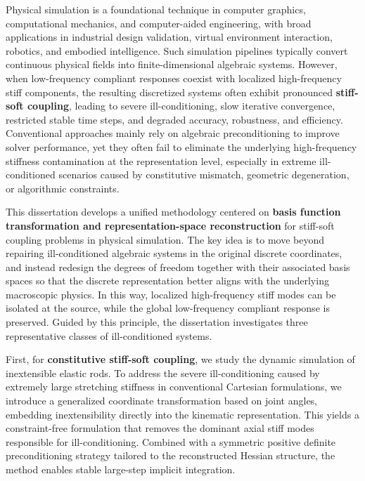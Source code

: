Physical simulation is a foundational technique in computer graphics, computational mechanics, and computer-aided engineering, with broad applications in industrial design validation, virtual environment interaction, robotics, and embodied intelligence. Such simulation pipelines typically convert continuous physical fields into finite-dimensional algebraic systems. However, when low-frequency compliant responses coexist with localized high-frequency stiff components, the resulting discretized systems often exhibit pronounced \textbf{stiff-soft coupling}, leading to severe ill-conditioning, slow iterative convergence, restricted stable time steps, and degraded accuracy, robustness, and efficiency. Conventional approaches mainly rely on algebraic preconditioning to improve solver performance, yet they often fail to eliminate the underlying high-frequency stiffness contamination at the representation level, especially in extreme ill-conditioned scenarios caused by constitutive mismatch, geometric degeneration, or algorithmic constraints.

This dissertation develops a unified methodology centered on \textbf{basis function transformation and representation-space reconstruction} for stiff-soft coupling problems in physical simulation. The key idea is to move beyond repairing ill-conditioned algebraic systems in the original discrete coordinates, and instead redesign the degrees of freedom together with their associated basis spaces so that the discrete representation better aligns with the underlying macroscopic physics. In this way, localized high-frequency stiff modes can be isolated at the source, while the global low-frequency compliant response is preserved. Guided by this principle, the dissertation investigates three representative classes of ill-conditioned systems.

First, for \textbf{constitutive stiff-soft coupling}, we study the dynamic simulation of inextensible elastic rods. To address the severe ill-conditioning caused by extremely large stretching stiffness in conventional Cartesian formulations, we introduce a generalized coordinate transformation based on joint angles, embedding inextensibility directly into the kinematic representation. This yields a constraint-free formulation that removes the dominant axial stiff modes responsible for ill-conditioning. Combined with a symmetric positive definite preconditioning strategy tailored to the reconstructed Hessian structure, the method enables stable large-step implicit integration.


